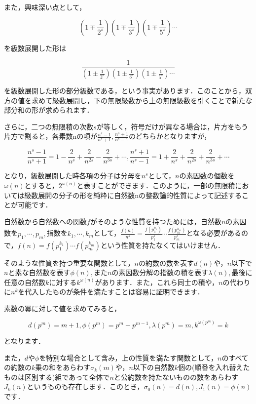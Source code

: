 \documentclass[./main]{subfiles}
\theoremstyle{break}
\begin{document}
また，興味深い点として，

\[\left( 1\mp \frac{1}{2^s} \right)\left( 1\mp \frac{1}{3^s} \right)\left( 1\mp\frac{1}{5^s} \right)\cdots\]

を級数展開した形は

\[\frac{1}{\left( 1\pm \frac{1}{2^s} \right)\left( 1\pm \frac{1}{3^s} \right)\left( 1\pm\frac{1}{5^s} \right)\cdots}\]

を級数展開した形の部分級数である，という事実があります．このことから，双方の値を求めて級数展開し，下の無限級数から上の無限級数を引くことで新たな部分和の形が求められます．

さらに，二つの無限積の次数$s$が等しく，符号だけが異なる場合は，片方をもう片方で割ると，各素数nの項が$\displaystyle\frac{n^s-1}{n^s+1},\frac{n^s+1}{n^s-1}$のどちらかとなりますが，

\[\frac{n^s-1}{n^s+1}=1-\frac{2}{n^s}+\frac{2}{n^{2s}}-\frac{2}{n^{3s}}+\cdots,\frac{n^s+1}{n^s-1}=1+\frac{2}{n^s}+\frac{2}{n^{2s}}+\frac{2}{n^{3s}}+\cdots\]

となり，級数展開した時各項の分子は分母を$n^s$として，$n$の素因数の個数を$\omega(n)$とすると，$2^{\omega(n)}$と表すことができます．このように，一部の無限積においては級数展開の分子の形を純粋に自然数nの整数論的性質によって記述することが可能です．

自然数から自然数への関数$f$がそのような性質を持つためには，自然数$n$の素因数を$p_1,\cdots,p_m,$指数を$k_1,\cdots,k_m$として，$\displaystyle\frac{f(n)}{n^s}=\frac{f(p_1^{k_1})}{p_1^s}\cdots\frac{f(p_m^{k_m})}{p_m^s}$となる必要があるので，$f(n)=f(p_1^{k_1})\cdots f(p_m^{k_m})$という性質を持たなくてはいけません．

そのような性質を持つ重要な関数として，$n$の約数の数を表す$d(n)$や，$n$以下で$n$と素な自然数を表す$\phi(n),$また$n$の素因数分解の指数の積を表す$\lambda(n),$最後に任意の自然数$k$に対する$k^{\omega(n)}$があります．また，これら同士の積や，$n$の代わりに$n^k$を代入したものが条件を満たすことは容易に証明できます．

素数の冪に対して値を求めてみると，

\[d(p^m)=m+1,\phi(p^m)=p^m-p^{m-1},\lambda(p^m)=m,k^{\omega(p^m)}=k\]

となります．

また，$d$や$\phi$を特別な場合として含み，上の性質を満たす関数として，$n$のすべての約数の$k$乗の和をあらわす$\sigma_k(m)$や，$n$以下の自然数$k$個の(順番を入れ替えたものは区別する)組であって全体で$n$と公約数を持たないものの数をあらわす$J_k(n)$というものも存在します．このとき，$\sigma_0(n)=d(n),J_1(n)=\phi(n)$です．
\end{document}
